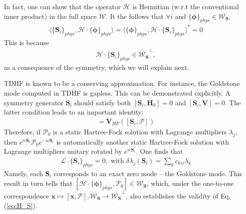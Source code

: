 \begin{subappendices}
In fact, one can show that the operator $\boldsymbol{\mathcal H}$ is Hermitian (w.r.t the conventional inner product) in the full space $\boldsymbol{\mathcal W}$. It the follows that $\forall i$ and $\{\boldsymbol\phi\}_{phys}\in \overline{\boldsymbol{\mathcal W}_{\mathbf S}}$,
\begin{align}
\langle \{\mathbf S_i\}_{phys},\boldsymbol{\mathcal H} \cdot \{\boldsymbol\phi\}_{phys}\rangle=\langle \{\boldsymbol\phi\}_{phys},\boldsymbol{\mathcal H} \cdot \{\mathbf S_i\}_{phys} \rangle^*=0
\end{align}
This is because 
\begin{align}
\boldsymbol{\mathcal H} \cdot \{\mathbf S_i\}_{phys} \in \overline{\boldsymbol{\mathcal W}_{\mathbf S}}^\perp,\label{eq:H_S}
\end{align}
as a consequence of the symmetry, which we will explain next.

TDHF is known to be a conserving approximation. For instance, the Goldstone mode computed in TDHF is gapless. This can be demonstrated explicitly. A symmetry generator $\mathbf S_i$ should satisfy both $[\mathbf S_i,\mathbf H_0]=0$ and $[\mathbf S_i,\mathbf V]=0$. The latter condition leads to an important identity:
\begin{align}
[\mathbf S_i,\mathbf V_{HF}(\boldsymbol{\mathcal P})]=\mathbf V_{HF}([\mathbf S_i,\boldsymbol{\mathcal P}])
\end{align}
Therefore, if $\boldsymbol{\mathcal P}_0$ is a static Hartree-Fock solution with Lagrange multipliers $\lambda_j$, then $e^{i\epsilon \mathbf S_i}\boldsymbol{\mathcal P}_0 e^{-i\epsilon \mathbf S_i}$ is automatically another static Hartree-Fock solution with Lagrange multipliers unitary rotated by $e^{i\epsilon \mathbf S_i}$. One finds that
\begin{align}
\boldsymbol{\mathcal L}\cdot\{\mathbf S_i\}_{phys}=0, \text{ with } \delta\lambda_j(\mathbf S_i)=\sum_k c_{kij}\lambda_k
\end{align}
Namely, each $\mathbf S_i$ corresponds to an exact zero mode -- the Goldstone mode. This result in turn tells that $[\boldsymbol{\mathcal H} \cdot \{\boldsymbol\phi\}_{phys},\boldsymbol{\mathcal P}_0]\in\boldsymbol{\mathcal W}_{\mathbf S}$, which, under the one-to-one correspondence $\mathbf x\mapsto[\mathbf x,\boldsymbol{\mathcal P}], \boldsymbol{\mathcal W}_{\mathbf S}\rightarrow\overline{\boldsymbol{\mathcal W}_{\mathbf S}}^\perp$, also establishes the validity of Eq.(\ref{eq:H_S}).


\end{subappendices}
